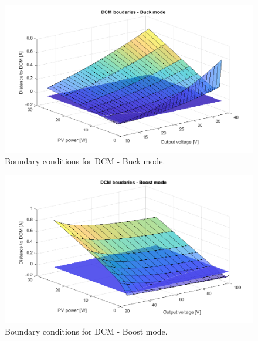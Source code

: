 \begin{figure}[H]
	\begin{center}
	\includegraphics[width=1\textwidth]{../Pictures/Buck_DistanceToDCM.png}
		\caption{Boundary conditions for DCM - Buck mode.}
		\label{DCM_3D_Buck}
	\end{center}	
\end{figure}



\begin{figure}[H]
	\begin{center}
		\includegraphics[width=1\textwidth]{../Pictures/Boost_DistanceToDCM.png}
		\caption{Boundary conditions for DCM - Boost mode.}
		\label{DCM_3D_Boost}
	\end{center}	
\end{figure}



